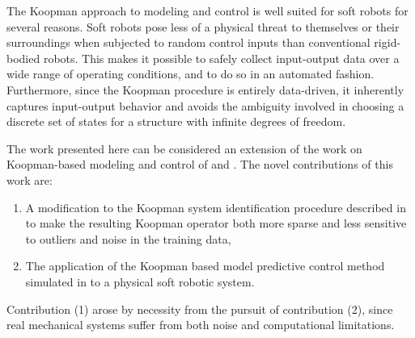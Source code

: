 The Koopman approach to modeling and control is well suited for soft robots for several reasons.
Soft robots pose less of a physical threat to themselves or their surroundings when subjected to random control inputs than conventional rigid-bodied robots. 
This makes it possible to safely collect input-output data over a wide range of operating conditions, and to do so in an automated fashion. 
Furthermore, since the Koopman procedure is entirely data-driven, it inherently captures input-output behavior and avoids the ambiguity involved in choosing a discrete set of states for a structure with infinite degrees of freedom.

The work presented here can be considered an extension of the work on Koopman-based modeling and control of \citet{mauroy2016linear} and \citet{korda2018linear}.
The novel contributions of this work are:
\begin{enumerate}
    \item A modification to the Koopman system identification procedure described in \cite{mauroy2016linear} to make the resulting Koopman operator both more sparse and less sensitive to outliers and noise in the training data,
    \item The application of the Koopman based model predictive control method simulated in \cite{korda2018linear} to a physical soft robotic system.
\end{enumerate}
Contribution (1) arose by necessity from the pursuit of contribution (2), since real mechanical systems suffer from both noise and computational limitations. 



